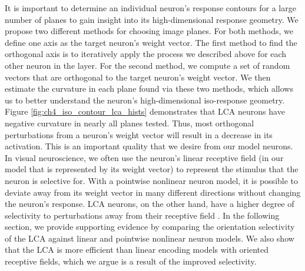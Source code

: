 It is important to determine an individual neuron's response contours for a large number of planes to gain insight into its high-dimensional response geometry.
We propose two different methods for choosing image planes.
For both methods, we define one axis as the target neuron's weight vector.
The first method to find the orthogonal axis is to iteratively apply the process we described above for each other neuron in the layer.
For the second method, we compute a set of random vectors that are orthogonal to the target neuron’s weight vector.
We then estimate the curvature in each plane found via these two methods, which allows us to better understand the neuron’s high-dimensional iso-response geometry.
Figure \ref{fig:ch4_iso_contour_lca_hists} demonstrates that LCA neurons have negative curvature in nearly all planes tested.
Thus, most orthogonal perturbations from a neuron's weight vector will result in a decrease in its activation.
This is an important quality that we desire from our model neurons.
In visual neuroscience, we often use the neuron's linear receptive field (in our model that is represented by its weight vector) to represent the stimulus that the neuron is selective for.
With a pointwise nonlinear neuron model, it is possible to deviate away from its weight vector in many different directions without changing the neuron's response.
LCA neurons, on the other hand, have a higher degree of selectivity to perturbations away from their receptive field \parencite{vilankar2017selectivity}.
In the following section, we provide supporting evidence by comparing the orientation selectivity of the LCA against linear and pointwise nonlinear neuron models.
We also show that the LCA is more efficient than linear encoding models with oriented receptive fields, which we argue is a result of the improved selectivity.

